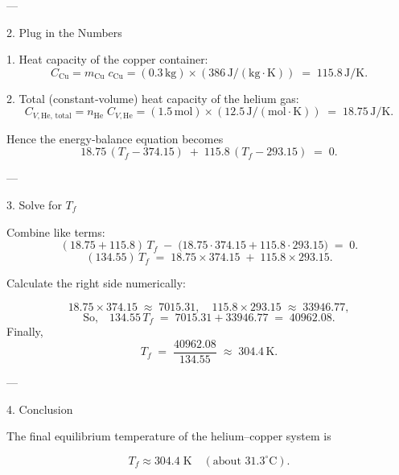 \documentclass[12pt]{article}
\theoremstyle{definition} %
\theoremstyle{plain} %
\begin{document}
---

2. Plug in the Numbers

1. Heat capacity of the copper container:
   \[
   C_{\text{Cu}}
   = m_{\text{Cu}}\; c_{\text{Cu}}
   = (0.3\,\mathrm{kg})\times(386\,\mathrm{J/(kg\cdot K)})
   \;=\;115.8\,\mathrm{J/K}.
   \]

2. Total (constant‐volume) heat capacity of the helium gas:
   \[
   C_{V,\text{He, total}}
   = n_{\text{He}}\; C_{V,\text{He}}
   = (1.5\,\mathrm{mol})\times(12.5\,\mathrm{J/(mol\cdot K)})
   \;=\;18.75\,\mathrm{J/K}.
   \]

Hence the energy‐balance equation becomes
\[
18.75\,(T_f - 374.15)
\;+\;
115.8\,(T_f - 293.15)
\;=\;0.
\]

---

3. Solve for \(T_f\)

Combine like terms:
\[
(18.75 + 115.8)\, T_f
\;-\;
\bigl(18.75\cdot 374.15 + 115.8\cdot 293.15\bigr)
\;=\;0.
\]
\[
(134.55)\, T_f
\;=\;
18.75 \times 374.15 \;+\; 115.8 \times 293.15.
\]

Calculate the right side numerically:

\[
18.75\times374.15 \;\approx\; 7015.31,
\quad
115.8\times293.15 \;\approx\;33946.77,
\]
\[
\text{So,}
\quad
134.55\,T_f 
\;=\; 7015.31 + 33946.77
\;=\;40962.08.
\]
Finally,
\[
T_f
\;=\;\frac{40962.08}{134.55}
\;\approx\;304.4\,\mathrm{K}.
\]

---

4. Conclusion

The final equilibrium temperature of the helium–copper system is

\[
\boxed{T_f \approx 304.4\;\mathrm{K}\quad (\text{about }31.3^\circ\mathrm{C}).
}
\] 
\end{document}
